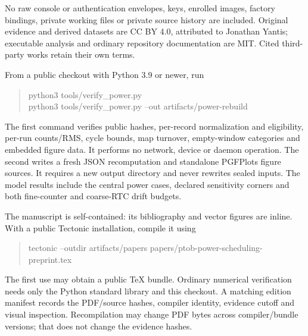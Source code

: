 \documentclass[11pt,letterpaper]{article}
\begin{document}
No raw console or authentication envelopes, keys, enrolled images, factory bindings, private working files or private source history are included. Original evidence and derived datasets are CC BY 4.0, attributed to Jonathan Yantis; executable analysis and ordinary repository documentation are MIT. Cited third-party works retain their own terms.

From a public checkout with Python 3.9 or newer, run
\begin{quote}\small\ttfamily
python3 tools/verify\_power.py\\
python3 tools/verify\_power.py --out artifacts/power-rebuild
\end{quote}
The first command verifies public hashes, per-record normalization and eligibility, per-run counts/RMS, cycle bounds, map turnover, empty-window categories and embedded figure data. It performs no network, device or daemon operation. The second writes a fresh JSON recomputation and standalone PGFPlots figure sources. It requires a new output directory and never rewrites sealed inputs. The model results include the central power cases, declared sensitivity corners and both fine-counter and coarse-RTC drift budgets.

The manuscript is self-contained: its bibliography and vector figures are inline. With a public Tectonic installation, compile it using
\begin{quote}\small\ttfamily
tectonic --outdir artifacts/papers papers/ptob-power-scheduling-preprint.tex
\end{quote}
The first use may obtain a public TeX bundle. Ordinary numerical verification needs only the Python standard library and this checkout. A matching edition manifest records the PDF/source hashes, compiler identity, evidence cutoff and visual inspection. Recompilation may change PDF bytes across compiler/bundle versions; that does not change the evidence hashes.
\end{document}
